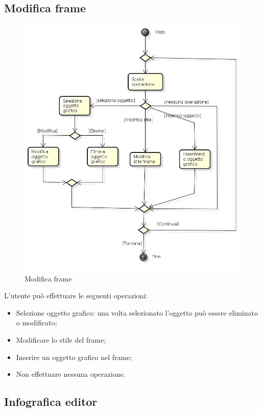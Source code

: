 \newpage

\subsection{Modifica frame}

\begin{figure}[h!]
		\centering
		\includegraphics[scale=.5]{img/attivita/Modifica_frame.jpg}
		\caption{Modifica frame}
		\label{fig:Modifica_frame}
\end{figure}

L'utente può effettuare le seguenti operazioni:
\begin{itemize}
\item Selezione oggetto grafico: una volta selezionato l'oggetto può essere eliminato o modificato;
\item Modificare lo stile del frame;
\item Inserire un oggetto grafico nel frame;
\item Non effettuare nessuna operazione.
\end{itemize}

\newpage

\subsection{Infografica editor}

